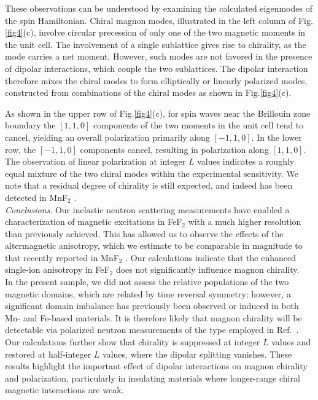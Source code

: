 \documentclass[aps, prl, twocolumn, superscriptaddress, longbibliography]{revtex4-2}
\begin{document}
These observations can be understood by examining the calculated eigenmodes of the spin Hamiltonian. Chiral magnon modes, illustrated in the left column of Fig.\ref{fig4}(c), involve circular precession of only one of the two magnetic moments in the unit cell. The involvement of a single sublattice gives rise to chirality, as the mode carries a net moment. However, such modes are not favored in the presence of dipolar interactions, which couple the two sublattices. The dipolar interaction therefore mixes the chiral modes to form elliptically or linearly polarized modes, constructed from combinations of the chiral modes as shown in Fig.\ref{fig4}(c).

As shown in the upper row of Fig.\ref{fig4}(c), for spin waves near the Brillouin zone boundary the $[1,1,0]$ components of the two moments in the unit cell tend to cancel, yielding an overall polarization primarily along $[-1,1,0]$. In the lower row, the $[-1,1,0]$ components cancel, resulting in polarization along $[1,1,0]$. The observation of linear polarization at integer $L$ values indicates a roughly equal mixture of the two chiral modes within the experimental sensitivity. We note that a residual degree of chirality is still expected, and indeed has been detected in MnF$_2$ \cite{faure2025_mnf2_neutron}.\\


{\it Conclusions}.
Our inelastic neutron scattering measurements have enabled a characterization of magnetic excitations in FeF$_2$ with a much higher resolution than previously achieved. This has allowed us to observe the effects of the altermagnetic anisotropy, which we estimate to be comparable in magnitude to that recently reported in MnF$_2$ \cite{faure2025_mnf2_neutron}. Our calculations indicate that the enhanced single-ion anisotropy in FeF$_2$ does not significantly influence magnon chirality. \\

In the present sample, we did not assess the relative populations of the two magnetic domains, which are related by time reversal symmetry; however, a significant domain imbalance has previously been observed or induced in both Mn- and Fe-based materials. It is therefore likely that magnon chirality will be detectable via polarized neutron measurements of the type employed in Ref.~\cite{faure2025_mnf2_neutron}. Our calculations further show that chirality is suppressed at integer $L$ values and restored at half-integer $L$ values, where the dipolar splitting vanishes. These results highlight the important effect of dipolar interactions on magnon chirality and polarization, particularly in insulating materials where longer-range chiral magnetic interactions are weak.
\end{document}
